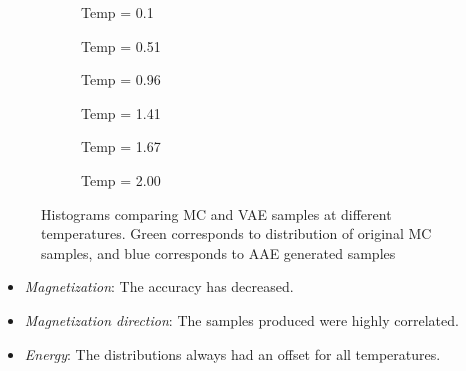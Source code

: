 \documentclass[12pt,a4paper]{article}
\begin{document}
\begin{figure}[h!]
    \centering
    \begin{subfigure}[t]{0.49\textwidth}
        \caption{Temp = 0.1}
    \end{subfigure}
    \hfill
    \begin{subfigure}[t]{0.49\textwidth}
        \caption{Temp = 0.51}
    \end{subfigure}
    \hfill
    \begin{subfigure}[t]{0.49\textwidth}
        \caption{Temp = 0.96}
    \end{subfigure}
    \hfill
    \begin{subfigure}[t]{0.49\textwidth}
        \caption{Temp = 1.41}
    \end{subfigure}
    \hfill
    \begin{subfigure}[t]{0.49\textwidth}
        \caption{Temp = 1.67}
    \end{subfigure}
    \hfill
    \begin{subfigure}[t]{0.49\textwidth}
        \caption{Temp = 2.00}
    \end{subfigure}
    \hfill
    \caption{Histograms comparing MC and VAE samples at different temperatures. Green corresponds to distribution of original MC samples, and blue corresponds to AAE generated samples}
\end{figure}

\begin{itemize}
    \item \textit{Magnetization}: The accuracy has decreased.\par
    \item \textit{Magnetization direction}: The samples produced were highly correlated.
    \item \textit{Energy}: The distributions always had an offset for all temperatures.\par
\end{itemize}

\end{document}
